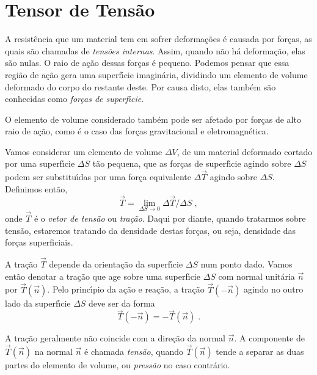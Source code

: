 \section{Tensor de Tens\~ao}
\label{tensor_tens}

A resist\^encia que um material tem em sofrer deforma\c{c}\~oes
\'e causada por for\c{c}as, as quais s\~ao chamadas de {\it
tens\~oes internas}. Assim, quando n\~ao h\'a deforma\c{c}\~ao,
elas s\~ao nulas. O raio de a\c{c}\~ao dessas for\c{c}as \'e
pequeno. Podemos pensar que essa regi\~ao de a\c{c}\~ao gera uma
superf\'{\i}cie imagin\'aria, dividindo um elemento de volume
deformado do corpo do restante deste. Por causa disto, elas
tamb\'em s\~ao conhecidas como {\it for\c{c}as de
superf\'{\i}cie}.

O elemento de volume considerado  tamb\'em pode ser afetado por
for\c{c}as de alto raio de a\c{c}\~ao, como \'e o caso das
for\c{c}as gravitacional e eletromagn\'etica.

Vamos considerar um elemento de volume $\Delta V$, de um material
deformado cortado por uma superf\'{\i}cie $\Delta S$ t\~ao
pequena, que as for\c{c}as de superf\'{\i}cie agindo sobre $\Delta
S$ podem ser substitu\'{\i}das por uma for\c{c}a equivalente
$\Delta \vec{T}$ agindo sobre $\Delta S$. Definimos ent\~ao,
\begin{equation}
\vec{T} = \lim_{\Delta S \rightarrow 0} {\Delta \vec{T} / \Delta
S}\;, \end{equation} onde $\vec{T}$ \'e o {\it vetor de tens\~ao}
ou {\it tra\c{c}\~ao}. Daqui por diante, quando tratarmos sobre
tens\~ao, estaremos tratando da densidade destas for\c{c}as, ou
seja, densidade das for\c{c}as superficiais.

A tra\c{c}\~ao $\vec{T}$ depende da orienta\c{c}\~ao da
superf\'{\i}cie $\Delta S$ num ponto dado. Vamos ent\~ao denotar a
tra\c{c}\~ao que age sobre uma superf\'{\i}cie $\Delta S$ com
normal unit\'aria $\vec{n}$ por $\vec{T}(\vec{n})$. Pelo
princ\'{\i}pio da a\c{c}\~ao e rea\c{c}\~ao, a tra\c{c}\~ao
$\vec{T}(-\vec{n})$ agindo no outro lado da superf\'{\i}cie
$\Delta S$ deve ser da forma
\begin{equation}
\vec{T}(-\vec{n})=-\vec{T}(\vec{n})\;.
\end{equation}

A tra\c{c}\~ao geralmente n\~ao coincide com a dire\c{c}\~ao da
normal $\vec{n}$. A componente de $\vec{T}(\vec{n})$ na normal
$\vec{n}$ \'e chamada {\it tens\~ao}, quando $\vec{T}(\vec{n})$
tende a separar as duas partes do elemento de volume, ou {\it
press\~ao} no caso contr\'ario.

